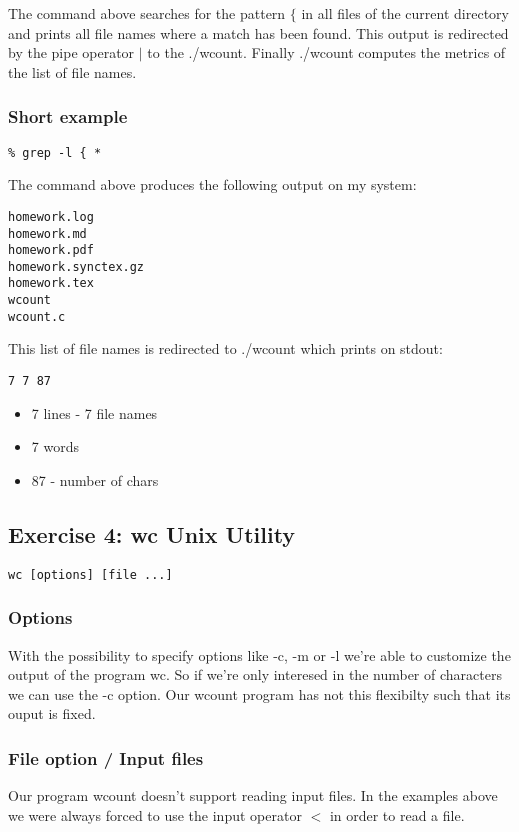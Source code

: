 \documentclass[12pt]{article}
\begin{document}
The command above searches for the pattern $\{$ in all files of the current directory and prints all file names where a match has been found. This output is redirected by the pipe operator $|$ to the ./wcount. Finally ./wcount computes the metrics of the list of file names.

\subsubsection*{Short example}

\begin{lstlisting}
% grep -l { * 
\end{lstlisting}
The command above produces the following output on my system:

\begin{lstlisting}
homework.log
homework.md
homework.pdf
homework.synctex.gz
homework.tex
wcount
wcount.c
\end{lstlisting}

This list of file names is redirected to ./wcount which prints on stdout:
\begin{lstlisting}
7 7 87
\end{lstlisting}
\begin{itemize}
	\item 7 lines - 7 file names
	\item 7 words
	\item 87 - number of chars
\end{itemize}

\subsection*{Exercise 4: wc Unix Utility}
\begin{lstlisting}
wc [options] [file ...]
\end{lstlisting}
\subsubsection*{Options}
With the possibility to specify options like -c, -m or -l we're able to customize the output of the program wc. 
So if we're only interesed in the number of characters we can use the -c option.
Our wcount program has not this flexibilty such that its ouput is fixed.

\subsubsection*{File option / Input files}
Our program wcount doesn't support reading input files. In the examples above we were always forced to use the input operator $<$ in order to read a file.
\end{document}

